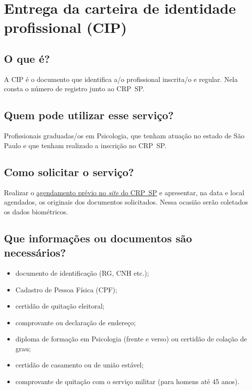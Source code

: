 \chapter{Entrega da carteira de identidade profissional (CIP)}
\label{chap:pf-cip}

\section{O que é?}

A CIP é o documento que identifica a/o profissional inscrita/o e regular. Nela consta o número de registro junto ao CRP~SP.

\section{Quem pode utilizar esse serviço?}

Profissionais graduadas/os em Psicologia, que tenham atuação no estado de São Paulo e que tenham realizado a inscrição no CRP~SP.

\section{Como solicitar o serviço?}

Realizar o \href{https://www.crpsp.org/agendamento}{agendamento prévio no \emph{site} do CRP~SP} e apresentar, na data e local agendados, os originais dos documentos solicitados. Nessa ocasião serão coletados os
dados biométricos.

\section{Que informações ou documentos são necessários?}

\begin{itemize}
\item
  documento de identificação (RG, CNH etc.);
\item
  Cadastro de Pessoa Física (CPF);
\item
  certidão de quitação eleitoral;
\item
  comprovante ou declaração de endereço;
\item
  diploma de formação em Psicologia (frente e verso) ou certidão de colação de grau;
\item
  certidão de casamento ou de união estável;
\item
  comprovante de quitação com o serviço militar (para homens até 45 anos).
\end{itemize}

